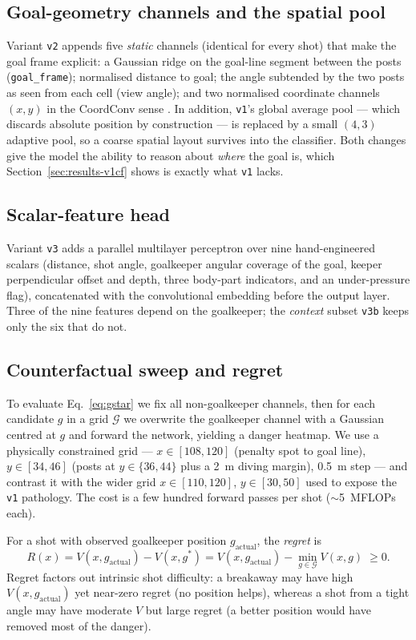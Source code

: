 \documentclass[11pt,a4paper]{article}
\newcommand{\gopt}{g^{*}}
\newcommand{\V}{V}
\begin{document}
\subsection{Goal-geometry channels and the spatial pool}
\label{sec:v2}
Variant \texttt{v2} appends five \emph{static} channels (identical for every
shot) that make the goal frame explicit: a Gaussian ridge on the goal-line
segment between the posts (\texttt{goal\_frame}); normalised distance to goal;
the angle subtended by the two posts as seen from each cell (view angle); and two
normalised coordinate channels $(x,y)$ in the CoordConv sense
\citep{liu2018coordconv}. In addition, \texttt{v1}'s global average pool --- which
discards absolute position by construction --- is replaced by a small $(4,3)$
adaptive pool, so a coarse spatial layout survives into the classifier. Both
changes give the model the ability to reason about \emph{where} the goal is,
which Section~\ref{sec:results-v1cf} shows is exactly what \texttt{v1} lacks.

\subsection{Scalar-feature head}
Variant \texttt{v3} adds a parallel multilayer perceptron over nine
hand-engineered scalars (distance, shot angle, goalkeeper angular coverage of the
goal, keeper perpendicular offset and depth, three body-part indicators, and an
under-pressure flag), concatenated with the convolutional embedding before the
output layer. Three of the nine features depend on the goalkeeper; the
\emph{context} subset \texttt{v3b} keeps only the six that do not.

\subsection{Counterfactual sweep and regret}
\label{sec:sweep}
To evaluate Eq.~\eqref{eq:gstar} we fix all non-goalkeeper channels, then for
each candidate $g$ in a grid $\mathcal{G}$ we overwrite the goalkeeper channel
with a Gaussian centred at $g$ and forward the network, yielding a danger
heatmap. We use a physically constrained grid --- $x\in[108,120]$ (penalty spot
to goal line), $y\in[34,46]$ (posts at $y\in\{36,44\}$ plus a \SI{2}{m} diving
margin), \SI{0.5}{m} step --- and contrast it with the wider grid
$x\in[110,120]$, $y\in[30,50]$ used to expose the \texttt{v1} pathology. The cost
is a few hundred forward passes per shot ($\sim$\num{5}~MFLOPs each).

For a shot with observed goalkeeper position $g_{\text{actual}}$, the
\emph{regret} is
\begin{equation}
  R(x) = \V(x,g_{\text{actual}}) - \V(x,\gopt)
       = \V(x,g_{\text{actual}}) - \min_{g\in\mathcal{G}}\V(x,g) \; \ge 0 .
  \label{eq:regret}
\end{equation}
Regret factors out intrinsic shot difficulty: a breakaway may have high
$\V(x,g_{\text{actual}})$ yet near-zero regret (no position helps), whereas a
shot from a tight angle may have moderate $\V$ but large regret (a better
position would have removed most of the danger).
\end{document}
